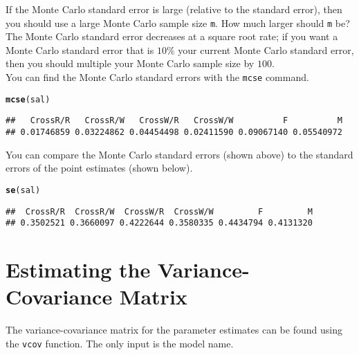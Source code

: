 \documentclass[11pt]{article}\usepackage[]{graphicx}\usepackage[]{color}
\makeatletter
\newcommand{\hlstd}[1]{\textcolor[rgb]{0.345,0.345,0.345}{#1}}%
\newcommand{\hlkwd}[1]{\textcolor[rgb]{0.737,0.353,0.396}{\textbf{#1}}}%
\newenvironment{kframe}{%
 \def\at@end@of@kframe{}%
 \ifinner\ifhmode%
  \def\at@end@of@kframe{\end{minipage}}%
  \begin{minipage}{\columnwidth}%
 \fi\fi%
 \def\FrameCommand##1{\hskip\@totalleftmargin \hskip-\fboxsep
 \colorbox{shadecolor}{##1}\hskip-\fboxsep
     \hskip-\linewidth \hskip-\@totalleftmargin \hskip\columnwidth}%
 \MakeFramed {\advance\hsize-\width
   \@totalleftmargin\z@ \linewidth\hsize
   \@setminipage}}%
 {\par\unskip\endMakeFramed%
 \at@end@of@kframe}
\newenvironment{knitrout}{}{} %
\makeatother
\begin{document}
If the Monte Carlo standard error is large (relative to the standard error), then you should use a large Monte Carlo sample size \texttt{m}. How much larger should \texttt{m} be? The Monte Carlo standard error decreases at a square root rate; if you want a Monte Carlo standard error that is $10\%$ your current Monte Carlo standard error, then you should multiple your Monte Carlo sample size by $100$.\\

You can find the Monte Carlo standard errors with the \texttt{mcse} command.
\begin{knitrout}
\color{fgcolor}\begin{kframe}
\begin{alltt}
\hlkwd{mcse}\hlstd{(sal)}
\end{alltt}
\begin{verbatim}
##   CrossR/R   CrossR/W   CrossW/R   CrossW/W          F          M 
## 0.01746859 0.03224862 0.04454498 0.02411590 0.09067140 0.05540972
\end{verbatim}
\end{kframe}
\end{knitrout}
You can compare the Monte Carlo standard errors (shown above) to the standard errors of the point estimates (shown below).
\begin{knitrout}
\color{fgcolor}\begin{kframe}
\begin{alltt}
\hlkwd{se}\hlstd{(sal)}
\end{alltt}
\begin{verbatim}
##  CrossR/R  CrossR/W  CrossW/R  CrossW/W         F         M 
## 0.3502521 0.3660097 0.4222644 0.3580335 0.4434794 0.4131320
\end{verbatim}
\end{kframe}
\end{knitrout}

\section{Estimating the Variance-Covariance Matrix}
The variance-covariance matrix for the parameter estimates can be found using the \texttt{vcov} function. The only input is the model name.\\
\end{document}
